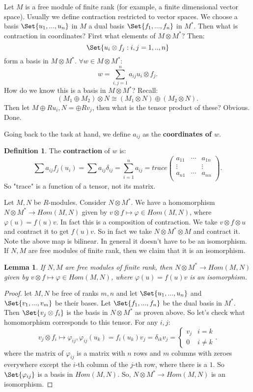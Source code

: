 \documentclass[9pt,reqno,twoside]{amsbook}
\theoremstyle{plain}
\numberwithin{section}{chapter}
\numberwithin{equation}{chapter}
\newtheorem{lem}[theorem]{Lemma}
\theoremstyle{definition}
\newtheorem{Def}[theorem]{Definition}
\theoremstyle{remark}
\theoremstyle{plain}
\newcommand{\tens}{\otimes}
\newcommand{\lpar}{\left(}
\newcommand{\rpar}{\right)}
\renewcommand{\phi}{\varphi}
\begin{document}
Let $M$ is a free module of finite rank (for example, a finite dimensional vector space). Usually we define contraction restricted to vector spaces. We choose a basis $\Set{u_1,...,u_n}$ in $M$ a dual basis $\Set{f_1,...,f_n}$ in $M^*$. Then what is contraction in coordinates? First what elements of $M \tens M^*$? Then:
$$
\Set{u_i \tens f_j:i,j = 1,..,n}
$$
form a basis in $M \tens M^*$. $\forall w \in M \tens M^*$:
$$
w = \sum_{i,j = 1}^n a_{ij}u_i \tens f_j.
$$
How do we know this is a basis in $M \tens M^*$? Recall: 
$$
(M_1 \oplus M_2) \tens N \cong (M_1 \tens N) \oplus (M_2 \tens N).
$$
Then let $M \oplus Ru_i,N = \oplus Rv_j$, then what is the tensor product of these? Obvious. Done. 

Going back to the task at hand, we define $a_{ij}$ as the \textbf{coordinates of $w$}. 

\begin{Def}
The \textbf{contraction }of $w$ is:
$$
\sum a_{ij}f_j(u_i) = \sum a_{ij}\delta_{ij} = \sum_{i  =1}^na_{ij} = trace\lpar 
\begin{matrix}
a_{11}& \cdots& a_{1n}\\
\vdots & & \vdots\\
a_{n1}& \cdots& a_{nn}\\
\end{matrix} \rpar.
$$
So "trace" is a function of a tensor, not its matrix. 
\end{Def}

Let $M,N$ be $R$-modules. Consider $N \tens M^*$. We have a homomorphism $N \tens M^* \to Hom(M,N)$ given by $v \tens f \mapsto \phi \in Hom(M,N)$, where $\phi(u) = f(u)v$. In fact this is a composition of contraction. We take $v \tens f \tens u$ and contract it to get $f(u)v$. So in fact we take $N \tens M^* \tens M$ and contract it. Note the above map is bilinear. In general it doesn't have to be an isomorphism. If $N,M$ are free modules of finite rank, then we claim that it is an isomorphism. 

\begin{lem}
If $N,M$ are free modules of finite rank, then $N \tens M^* \to Hom(M,N)$ given by $v \tens f \mapsto \phi \in Hom(M,N)$, where $\phi(u) = f(u)v$ is an isomorphism. 
\end{lem}

\begin{proof}
let $M,N$ be free of ranks $m,n$ and let $\Set{u_1,...,u_n}$ and $\Set{v_1,...,v_m}$ be their bases. Let $\Set{f_1,...,f_n}$ be the dual basis in $M^*$. Then $\Set{v_j \tens f_i}$ is the basis in $N \tens M^*$ as proven above. So let's check what homomorphism corresponds to this tensor. For any $i,j$: $$
v_j \tens f_i \mapsto \phi_{ij}, \phi_{ij}(u_k) = f_i(u_k)v_j = \delta_{ik}v_j = \begin{cases}
v_j & i = k\\
0 & i \neq k
\end{cases}. 
$$
where the matrix of $\phi_{ij}$ is a matrix with $n$ rows and $m$ columns with zeroes everywhere except the $i$-th column of the $j$-th row, where there is a $1$. So $\Set{\phi_{ij}}$ is a basis in $Hom(M,N)$. So, $N \tens M^* \to Hom(M,N)$ is an isomorphism. 
\end{proof}
\end{document}

